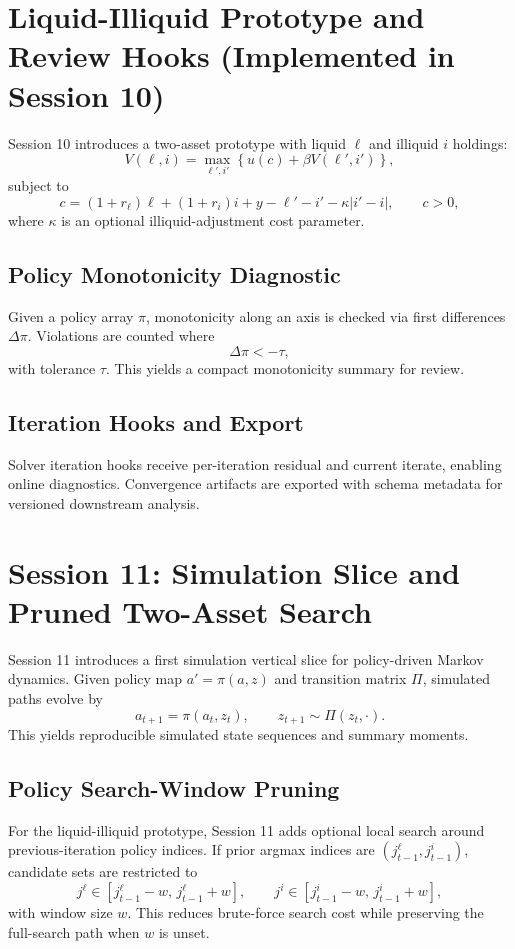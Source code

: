 \documentclass[11pt]{article}
\begin{document}
\section{Liquid-Illiquid Prototype and Review Hooks (Implemented in Session 10)}
Session 10 introduces a two-asset prototype with liquid \(\ell\) and illiquid
\(i\) holdings:
\begin{equation}
    V(\ell,i)=\max_{\ell',i'}\left\{u(c)+\beta V(\ell',i')\right\},
\end{equation}
subject to
\begin{equation}
    c=(1+r_\ell)\ell + (1+r_i)i + y - \ell' - i' - \kappa|i'-i|, \qquad c>0,
\end{equation}
where \(\kappa\) is an optional illiquid-adjustment cost parameter.

\subsection{Policy Monotonicity Diagnostic}
Given a policy array \(\pi\), monotonicity along an axis is checked via first
differences \(\Delta \pi\). Violations are counted where
\begin{equation}
    \Delta \pi < -\tau,
\end{equation}
with tolerance \(\tau\). This yields a compact monotonicity summary for review.

\subsection{Iteration Hooks and Export}
Solver iteration hooks receive per-iteration residual and current iterate,
enabling online diagnostics. Convergence artifacts are exported with schema
metadata for versioned downstream analysis.

\section{Session 11: Simulation Slice and Pruned Two-Asset Search}
Session 11 introduces a first simulation vertical slice for policy-driven
Markov dynamics. Given policy map \(a' = \pi(a,z)\) and transition matrix
\(\Pi\), simulated paths evolve by
\begin{equation}
    a_{t+1} = \pi(a_t, z_t), \qquad z_{t+1} \sim \Pi(z_t, \cdot).
\end{equation}
This yields reproducible simulated state sequences and summary moments.

\subsection{Policy Search-Window Pruning}
For the liquid-illiquid prototype, Session 11 adds optional local search around
previous-iteration policy indices. If prior argmax indices are
\((j^{\ell}_{t-1}, j^{i}_{t-1})\), candidate sets are restricted to
\begin{equation}
    j^{\ell} \in [j^{\ell}_{t-1}-w,\, j^{\ell}_{t-1}+w],
    \qquad
    j^{i} \in [j^{i}_{t-1}-w,\, j^{i}_{t-1}+w],
\end{equation}
with window size \(w\). This reduces brute-force search cost while preserving
the full-search path when \(w\) is unset.
\end{document}
